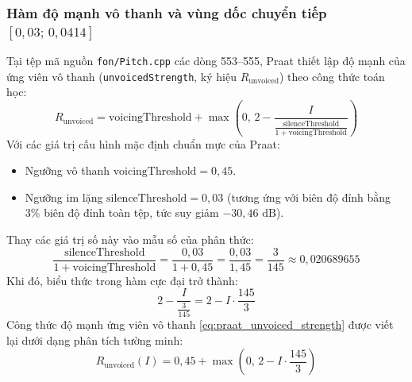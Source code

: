 \subsubsection*{Hàm độ mạnh vô thanh và vùng dốc chuyển tiếp $[0{,}03;\, 0{,}0414]$}
Tại tệp mã nguồn \texttt{fon/Pitch.cpp} các dòng 553--555, Praat thiết lập độ mạnh của ứng viên vô thanh (\texttt{unvoicedStrength}, ký hiệu $R_{\text{unvoiced}}$) theo công thức toán học:
\begin{equation}
    R_{\text{unvoiced}} = \text{voicingThreshold} + \max\left(0,\, 2 - \frac{I}{\frac{\text{silenceThreshold}}{1 + \text{voicingThreshold}}}\right)
    \label{eq:praat_unvoiced_strength}
\end{equation}
Với các giá trị cấu hình mặc định chuẩn mực của Praat:
\begin{itemize}
    \item Ngưỡng vô thanh $\text{voicingThreshold} = 0{,}45$.
    \item Ngưỡng im lặng $\text{silenceThreshold} = 0{,}03$ (tương ứng với biên độ đỉnh bằng $3\%$ biên độ đỉnh toàn tệp, tức suy giảm $-30{,}46\text{ dB}$).
\end{itemize}
Thay các giá trị số này vào mẫu số của phân thức:
\begin{equation}
    \frac{\text{silenceThreshold}}{1 + \text{voicingThreshold}} = \frac{0{,}03}{1 + 0{,}45} = \frac{0{,}03}{1{,}45} = \frac{3}{145} \approx 0{,}020689655
\end{equation}
Khi đó, biểu thức trong hàm cực đại trở thành:
\begin{equation}
    2 - \frac{I}{\frac{3}{145}} = 2 - I \cdot \frac{145}{3}
\end{equation}
Công thức độ mạnh ứng viên vô thanh \eqref{eq:praat_unvoiced_strength} được viết lại dưới dạng phân tích tường minh:
\begin{equation}
    R_{\text{unvoiced}}(I) = 0{,}45 + \max\left(0,\, 2 - I \cdot \frac{145}{3}\right)
    \label{eq:praat_unvoiced_numeric}
\end{equation}


